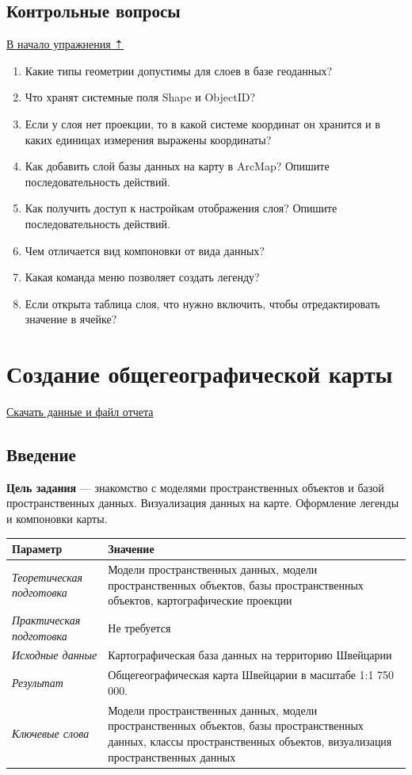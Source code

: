 \documentclass[12pt,]{book}
\begin{document}
\hypertarget{map-design-quaternary-questions}{%
\section{Контрольные вопросы}\label{map-design-quaternary-questions}}

\protect\hyperlink{map-design-quaternary}{В начало упражнения ⇡}

\begin{enumerate}
\def\labelenumi{\arabic{enumi}.}
\item
  Какие типы геометрии допустимы для слоев в базе геоданных?
\item
  Что хранят системные поля Shape и ObjectID?
\item
  Если у слоя нет проекции, то в какой системе координат он хранится и в каких единицах измерения выражены координаты?
\item
  Как добавить слой базы данных на карту в ArcMap? Опишите последовательность действий.
\item
  Как получить доступ к настройкам отображения слоя? Опишите последовательность действий.
\item
  Чем отличается вид компоновки от вида данных?
\item
  Какая команда меню позволяет создать легенду?
\item
  Если открыта таблица слоя, что нужно включить, чтобы отредактировать значение в ячейке?
\end{enumerate}

\hypertarget{map-design-general}{%
\chapter{Создание общегеографической карты}\label{map-design-general}}

\href{http://autolab.geogr.msu.ru/gis/data/Ex02.zip}{Скачать данные и файл отчета}

\hypertarget{map-design-general-intro}{%
\section{Введение}\label{map-design-general-intro}}

\textbf{Цель задания} --- знакомство с моделями пространственных объектов и базой пространственных данных. Визуализация данных на карте. Оформление легенды и компоновки карты.

\begin{longtable}[]{@{}ll@{}}
\toprule
Параметр & Значение\tabularnewline
\midrule
\endhead
\emph{Теоретическая подготовка} & Модели пространственных данных, модели пространственных объектов, базы пространственных объектов, картографические проекции\tabularnewline
\emph{Практическая подготовка} & Не требуется\tabularnewline
\emph{Исходные данные} & Картографическая база данных на территорию Швейцарии\tabularnewline
\emph{Результат} & Общегеографическая карта Швейцарии в масштабе 1:1 750 000.\tabularnewline
\emph{Ключевые слова} & Модели пространственных данных, модели пространственных объектов, базы пространственных данных, классы пространственных объектов, визуализация пространственных данных\tabularnewline
\bottomrule
\end{longtable}
\end{document}
